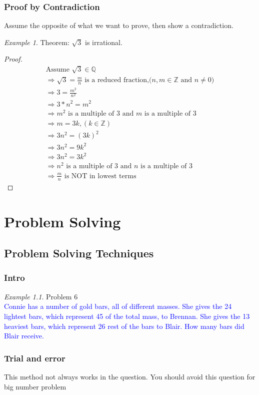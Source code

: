 \documentclass[11pt]{report}
\theoremstyle{remark}
\newtheorem*{example}{Example}
\newcommand{\Z}{\mathbb{Z}}
\begin{document}
	\subsection{Proof by Contradiction}
	Assume the opposite of what we want to prove, then show a contradiction.
	\begin{example}
		Theorem: $\sqrt{3}$ is irrational.
		\begin{proof}
			\begin{gather}
				\text{Assume $\sqrt{3} \in \mathbb{Q}$} \\
				\Rightarrow \sqrt{3} = \frac{m}{n} \text{ is a reduced fraction,($n, m \in \mathbb{Z}$ and $n \neq 0$)}\\
				\Rightarrow 3 = \frac{m^2}{n^2}\\
				\Rightarrow 3*n^2 = m^2 \\
				\Rightarrow m^2 \text{ is a multiple of $3$ and $m$ is a multiple of $3$} \\
				\Rightarrow m = 3k, (k \in \Z) \\
				\Rightarrow 3n^2 = (3k)^2 \\
				\Rightarrow 3n^2 = 9k^2 \\
				\Rightarrow 3n^2 = 3k^2\\
				\Rightarrow n^2 \text{ is a multiple of $3$ and $n$ is a multiple of $3$}\\
				\Rightarrow \frac{m}{n} \text{ is NOT in lowest terms}
			\end{gather}
		\end{proof}
	\end{example}
	
	\newpage
	\chapter{Problem Solving}
	\section{Problem Solving Techniques}
	\subsection{Intro}

	\begin{example}
		Problem 6\\
		\textcolor{blue}{Connie has a number of gold bars, all of different masses. She gives the 24 lightest bars, which represent 45%
		of the total mass, to Brennan. She gives the 13 heaviest bars, which represent 26%
		rest of the bars to Blair. How many bars did Blair receive.}\\
		
	\end{example}
	
	\subsection{Trial and error}
	This method not always works in the question. You should avoid this question for big number problem
\end{document}
